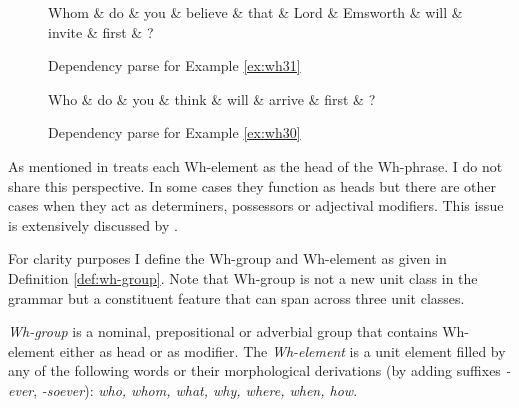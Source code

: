 \begin{figure}[H]
	\centering
	\begin{dependency}
		\begin{deptext}[]
			Whom \& do \& you \& believe \& that \& Lord \& Emsworth \& will \& invite \& first \& ?\\
		\end{deptext}
	\end{dependency}
	\caption{Dependency parse for Example \ref{ex:wh31}}
	\label{fig:e18}
\end{figure}
\begin{figure}[H]
	\centering
	\begin{dependency}
		\begin{deptext}[]
			Who \& do \& you \& think \& will \& arrive \& first \& ?\\
		\end{deptext}
	\end{dependency}
	\caption{Dependency parse for Example \ref{ex:wh30}}
	\label{fig:e19}
\end{figure}


As mentioned in \citet[375]{Haegeman1991} treats each Wh-element as the head of the Wh-phrase. I do not share this perspective. In some cases they function as heads but there are other cases when they act as determiners, possessors or adjectival modifiers. This issue is extensively discussed by \citet{Abney1987,Quirk1985,Halliday2013}. 

For clarity purposes I define the Wh-group and Wh-element as given in Definition \ref{def:wh-group}. Note that Wh-group is not a new unit class in the grammar but a constituent feature that can span across three unit classes.

\begin{definition}\label{def:wh-group}
    \textit{Wh-group} is a nominal, prepositional or adverbial group that contains Wh-element either as head or as modifier. The \textit{Wh-element} is a unit element filled by any of the following words or their morphological derivations (by adding suffixes \textit{-ever}, \textit{-soever}): \textit{who, whom, what, why, where, when, how}.
\end{definition}


